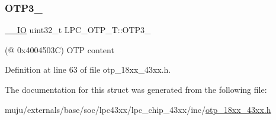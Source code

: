 \subsubsection{\texorpdfstring{O\+T\+P3\+\_}{OTP3\_3}}
{\footnotesize\ttfamily \hyperlink{core__sc300_8h_aec43007d9998a0a0e01faede4133d6be}{\+\_\+\+\_\+\+IO} uint32\+\_\+t L\+P\+C\+\_\+\+O\+T\+P\+\_\+\+T\+::\+O\+T\+P3\+\_}

(@ 0x4004503C) O\+TP content 

Definition at line 63 of file otp\+\_\+18xx\+\_\+43xx.\+h.



The documentation for this struct was generated from the following file\+:\begin{DoxyCompactItemize}
\item 
muju/externals/base/soc/lpc43xx/lpc\+\_\+chip\+\_\+43xx/inc/\hyperlink{otp__18xx__43xx_8h}{otp\+\_\+18xx\+\_\+43xx.\+h}\end{DoxyCompactItemize}

